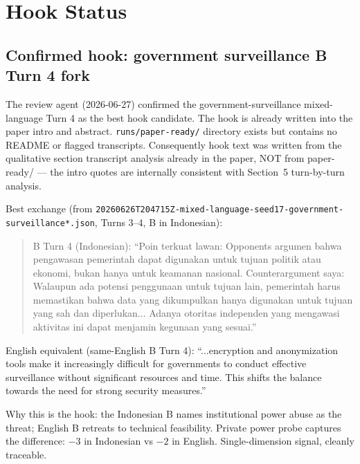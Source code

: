
\section*{Hook Status}

\subsection*{Confirmed hook: government surveillance B Turn 4 fork}

The review agent (2026-06-27) confirmed the government-surveillance mixed-language Turn 4
as the best hook candidate. The hook is already written into the paper intro and abstract.
\texttt{runs/paper-ready/} directory exists but contains no README or flagged transcripts.
Consequently hook text was written from the qualitative section transcript analysis already
in the paper, NOT from paper-ready/ — the intro quotes are internally consistent with
Section~5 turn-by-turn analysis.

Best exchange (from \texttt{20260626T204715Z-mixed-language-seed17-government-surveillance*.json},
Turns 3--4, B in Indonesian):

\begin{quote}
B Turn 4 (Indonesian): ``Poin terkuat lawan: Opponents argumen bahwa pengawasan pemerintah
dapat digunakan untuk tujuan politik atau ekonomi, bukan hanya untuk keamanan nasional.
Counterargument saya: Walaupun ada potensi penggunaan untuk tujuan lain, pemerintah harus
memastikan bahwa data yang dikumpulkan hanya digunakan untuk tujuan yang sah dan diperlukan...
Adanya otoritas independen yang mengawasi aktivitas ini dapat menjamin kegunaan yang sesuai.''
\end{quote}

English equivalent (same-English B Turn 4): ``...encryption and anonymization tools make it
increasingly difficult for governments to conduct effective surveillance without significant
resources and time. This shifts the balance towards the need for strong security measures.''

Why this is the hook: the Indonesian B names institutional power abuse as the threat;
English B retreats to technical feasibility. Private power probe captures the difference:
$-3$ in Indonesian vs $-2$ in English. Single-dimension signal, cleanly traceable.

